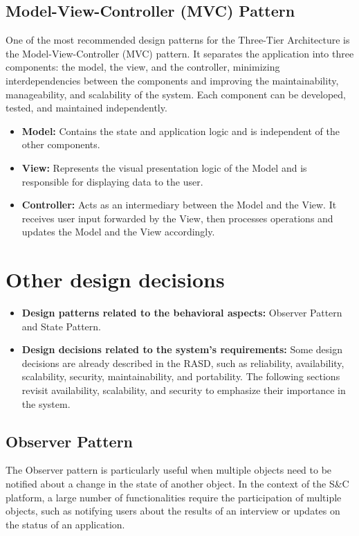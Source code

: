 \subsection{Model-View-Controller (MVC) Pattern}\label{subsec:model-view-controller pattern}
One of the most recommended design patterns for the Three-Tier Architecture is the Model-View-Controller (MVC) pattern. It separates the application into three 
components: the model, the view, and the controller, minimizing interdependencies between the components and improving the maintainability, manageability, and 
scalability of the system. Each component can be developed, tested, and maintained independently.
\begin{itemize}
\item \textbf{Model:} Contains the state and application logic and is independent of the other components.
\item \textbf{View:} Represents the visual presentation logic of the Model and is responsible for displaying data to the user.
\item \textbf{Controller:} Acts as an intermediary between the Model and the View. It receives user input forwarded by the View, then processes operations and 
updates the Model and the View accordingly.
\end{itemize}

\section{Other design decisions}\label{sec:other design decisions}
\begin{itemize}
    \item \textbf{Design patterns related to the behavioral aspects:} Observer Pattern and State Pattern.
    \item \textbf{Design decisions related to the system's requirements:} Some design decisions are already described in the RASD, such as reliability, 
    availability, scalability, security, maintainability, and portability. 
    The following sections revisit availability, scalability, and security to emphasize their importance in the system.
\end{itemize}
\subsection{Observer Pattern}\label{subsec:observer pattern}
The Observer pattern is particularly useful when multiple objects need to be notified about a change in the state of another object. In the context of the 
S\&C platform, a large number of functionalities require the participation of multiple objects, such as notifying users about the results of an interview or 
updates on the status of an application.
